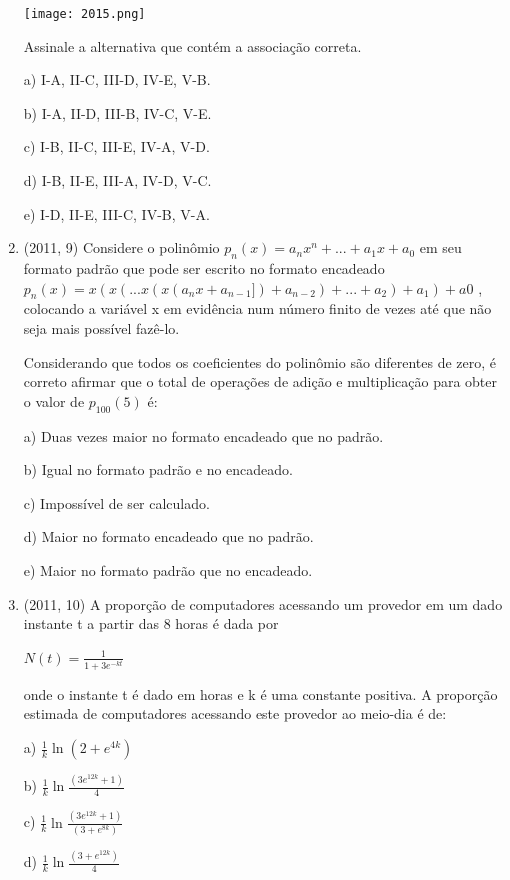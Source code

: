 \documentclass{article}
\begin{document}
\begin{enumerate}
\texttt{[image: 2015.png]}\newline


Assinale a alternativa que contém a associação correta.

a) I-A, II-C, III-D, IV-E, V-B.

b) I-A, II-D, III-B, IV-C, V-E.

c) I-B, II-C, III-E, IV-A, V-D.

d) I-B, II-E, III-A, IV-D, V-C.

e) I-D, II-E, III-C, IV-B, V-A.\newline



\item(2011, 9) Considere o polinômio $p_n (x) = a_n x^n + ... + a_1x + a_0$ em seu formato padrão que pode ser escrito no formato encadeado $p_n (x) = x(x(...x(x(a_nx + a_{n−1}] ) + a_{n−2} ) + ... + a_2 ) + a_1 ) + a 0$ , colocando a variável x em evidência num número finito de vezes até que não seja mais possível fazê-lo.

Considerando que todos os coeficientes do polinômio são diferentes de zero, é correto afirmar que o total
de operações de adição e multiplicação para obter o valor de $p_{100} (5)$ é:

a) Duas vezes maior no formato encadeado que no padrão.

b) Igual no formato padrão e no encadeado.

c) Impossível de ser calculado.

d) Maior no formato encadeado que no padrão.

e) Maior no formato padrão que no encadeado.\newline





\item(2011, 10) A proporção de computadores acessando um provedor em um dado instante t a partir das 8 horas é dada por

$N(t)=\frac{1}{1+3e^{-kt}}$

onde o instante t é dado em horas e k é uma constante positiva. A proporção estimada de computadores acessando este provedor ao meio-dia é de:

a) $\frac{1}{k} \ln (2 + e^{4k})$

b) $\frac{1}{k} \ln \frac{(3e^{12k} + 1)}{4} $

c) $\frac{1}{k} \ln \frac{(3e^{12k} + 1)}{(3 + e^{8k})} $

d) $\frac{1}{k} \ln \frac{(3 + e^{12k})}{4} $


\end{enumerate}
\end{document}
